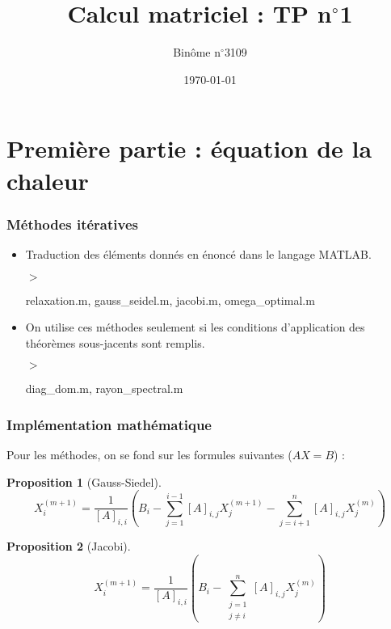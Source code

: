 \documentclass[11pt]{beamer}
\title[Calcul Matriciel]{Calcul matriciel : TP n$^\circ$1}
\author{Binôme n$^\circ$3109}
\date{\today}
\newtheorem{proposition}{Proposition}[section]
\begin{document}
	\begin{frame}
		\titlepage
	\end{frame}
	
	\begin{frame}
		\tableofcontents
	\end{frame}

	\section{Première partie : équation de la chaleur}
	\begin{frame}
		\tableofcontents[currentsection]
	\end{frame}

	\begin{frame}
		\frametitle{Méthodes itératives}
		\begin{itemize}
			\item Traduction des éléments donnés en énoncé dans le langage MATLAB.
			\item[$>$] \begin{semiverbatim}
				relaxation.m, gauss\_seidel.m, jacobi.m, omega\_optimal.m
			\end{semiverbatim}
			\item On utilise ces méthodes seulement si les conditions d'application des théorèmes sous-jacents sont remplis. 
			\item[$>$] \begin{semiverbatim}
				diag\_dom.m, rayon\_spectral.m
			\end{semiverbatim}
		\end{itemize}
	\end{frame}

	\begin{frame}
		\frametitle{Implémentation mathématique}
		Pour les méthodes, on se fond sur les formules suivantes ($AX=B$) : 
		\begin{proposition}[Gauss-Siedel]
			\[X_i^{(m+1)}=\frac{1}{[A]_{i,i}}\left(B_i - \sum_{j=1}^{i-1} [A]_{i,j} X_j^{(m+1)} - \sum_{j=i+1}^{n} [A]_{i,j} X_j^{(m)}\right)\]
		\end{proposition}
	
		\begin{proposition}[Jacobi]
			\[X_i^{(m+1)}=\frac{1}{[A]_{i,i}}\left(B_i - \sum_{\substack{j=1 \\ j \neq i}}^{n} [A]_{i,j} X_j^{(m)} \right)\]
		\end{proposition}
	\end{frame}
\end{document}

